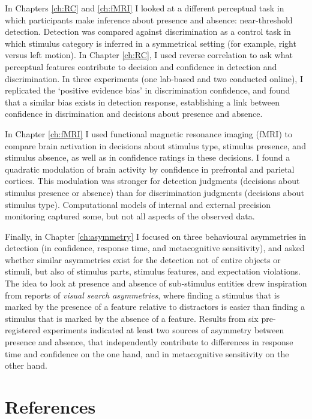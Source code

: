 \documentclass[12pt,twoside]{reedthesis}
\begin{document}
In Chapters \ref{ch:RC} and \ref{ch:fMRI} I looked at a different perceptual task in which participants make inference about presence and absence: near-threshold detection. Detection was compared against discrimination as a control task in which stimulus category is inferred in a symmetrical setting (for example, right versus left motion). In Chapter \ref{ch:RC}, I used reverse correlation to ask what perceptual features contribute to decision and confidence in detection and discrimination. In three experiments (one lab-based and two conducted online), I replicated the `positive evidence bias' in discrimination confidence, and found that a similar bias exists in detection response, establishing a link between confidence in disrimination and decisions about presence and absence.

In Chapter \ref{ch:fMRI} I used functional magnetic resonance imaging (fMRI) to compare brain activation in decisions about stimulus type, stimulus presence, and stimulus absence, as well as in confidence ratings in these decisions. I found a quadratic modulation of brain activity by confidence in prefrontal and parietal cortices. This modulation was stronger for detection judgments (decisions about stimulus presence or absence) than for discrimination judgments (decisions about stimulus type). Computational models of internal and external precision monitoring captured some, but not all aspects of the observed data.

Finally, in Chapter \ref{ch:asymmetry} I focused on three behavioural asymmetries in detection (in confidence, response time, and metacognitive sensitivity), and asked whether similar asymmetries exist for the detection not of entire objects or stimuli, but also of stimulus parts, stimulus features, and expectation violations. The idea to look at presence and absence of sub-stimulus entities drew inspiration from reports of \emph{visual search asymmetries}, where finding a stimulus that is marked by the presence of a feature relative to distractors is easier than finding a stimulus that is marked by the absence of a feature. Results from six pre-registered experiments indicated at least two sources of asymmetry between presence and absence, that independently contribute to differences in response time and confidence on the one hand, and in metacognitive sensitivity on the other hand.

\backmatter

\hypertarget{references}{%
\chapter*{References}\label{references}}
\end{document}
